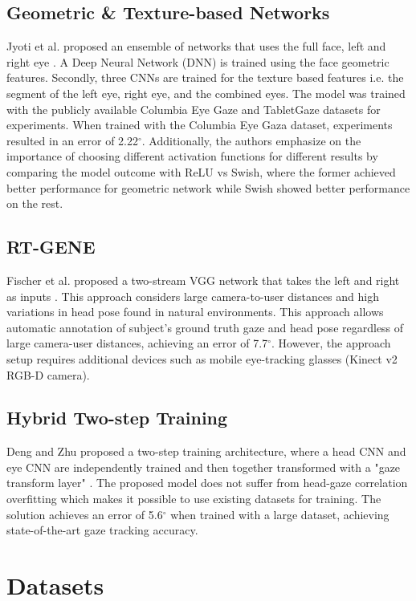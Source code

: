 \subsection{Geometric \& Texture-based Networks}
Jyoti et al. proposed an ensemble of networks that uses the full face, left and right eye \cite{jyoti_automatic_2018}.
A Deep Neural Network (DNN) is trained using the face geometric features. Secondly, three CNNs are trained for the texture based features i.e. the segment of the left eye, right eye, and the combined eyes. The model was trained with the publicly available Columbia Eye Gaze and TabletGaze datasets for experiments. When trained with the Columbia Eye Gaza dataset, experiments resulted in an error of 2.22$^{\circ}$. Additionally, the authors emphasize on the importance of choosing
different activation functions for different results by comparing the model outcome with ReLU vs Swish, where the former achieved better performance for geometric network while Swish showed better performance on the rest.

\subsection{RT-GENE}
Fischer et al. proposed a two-stream VGG network that takes the left and right as inputs \cite{fischer_rt-gene_2018}. This approach considers large camera-to-user distances and high variations in head pose found in natural environments. This approach allows automatic annotation of subject's ground truth gaze and head pose regardless of large camera-user distances, achieving an error of 7.7$^{\circ}$. However, the approach setup requires additional devices such as mobile eye-tracking glasses (Kinect v2 RGB-D camera).

\subsection{Hybrid Two-step Training}
Deng and Zhu proposed a two-step training architecture, where a head CNN and eye CNN are independently trained and then together transformed with a "gaze transform layer" \cite{deng_monocular_2017}. The proposed model does not suffer from head-gaze correlation overfitting which makes it possible to use existing datasets for training. The solution achieves an error of 5.6$^{\circ}$ when trained with a large dataset, achieving state-of-the-art gaze tracking accuracy. 

\section{Datasets}
\label{state-art-datasets}


